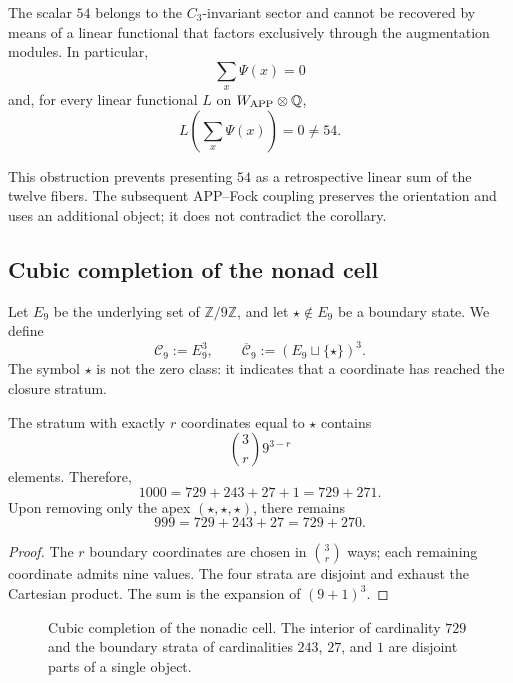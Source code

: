 \begin{corollary}
\label{p12-83-c1-s5:cor:obstruccion-isotipica-app-autonoma}
The scalar \(54\) belongs to the \(C_3\)-invariant sector and cannot
be recovered by means of a linear functional that factors exclusively through
the augmentation modules. In particular,
\[
 \sum_x\Psi(x)=0
\]
and, for every linear functional \(L\) on \(W_{\rm APP}\otimes\mathbb Q\),
\[
 L\!\left(\sum_x\Psi(x)\right)=0\neq54.
\]
\end{corollary}

This obstruction prevents presenting \(54\) as a retrospective linear sum
of the twelve fibers. The subsequent APP--Fock coupling preserves the
orientation and uses an additional object; it does not contradict the corollary.

\subsection{Cubic completion of the nonad cell}

Let \(E_9\) be the underlying set of \(\mathbb Z/9\mathbb Z\), and let
\(\star\notin E_9\) be a boundary state. We define
\[
 \mathcal C_9:=E_9^3,
 \qquad
 \overline{\mathcal C}_9:=(E_9\sqcup\{\star\})^3.
\]
The symbol \(\star\) is not the zero class: it indicates that a coordinate has
reached the closure stratum.

\begin{theorem}
\label{p12-83-c1-s5:thm:emrh-binomial-autonoma}
The stratum with exactly \(r\) coordinates equal to \(\star\) contains
\[
 \binom3r9^{3-r}
\]
elements. Therefore,
\[
 \boxed{1000=729+243+27+1=729+271.}
\]
Upon removing only the apex \((\star,\star,\star)\), there remains
\[
 999=729+243+27=729+270.
\]
\end{theorem}

\begin{proof}
The \(r\) boundary coordinates are chosen in \(\binom3r\) ways; each
remaining coordinate admits nine values. The four strata are disjoint
and exhaust the Cartesian product. The sum is the expansion of
\((9+1)^3\).
\end{proof}

\begin{figure}[htbp]
\centering
\resizebox{0.96\linewidth}{!}{}
\caption{Cubic completion of the nonadic cell. The interior of
cardinality \(729\) and the boundary strata of cardinalities \(243\), \(27\), and
\(1\) are disjoint parts of a single object.}
\label{p12-83-c1-s5:fig:cubo-emrh-autonomo}
\end{figure}


